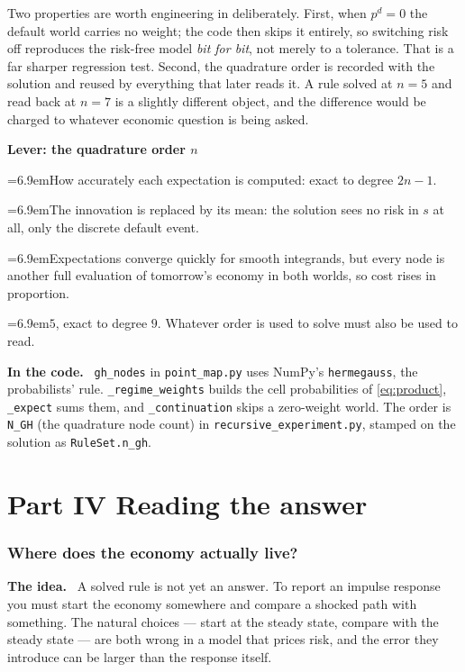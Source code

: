 \documentclass[10pt,a4paper]{article}
\newenvironment{idea}{\begin{shaded}\noindent\textbf{The idea.}\ }{\end{shaded}}
\newcommand{\leverrow}[2]{\par\noindent\hangindent=6.9em\hangafter=1\makebox[6.9em][l]{\textit{#1}}#2}
\newenvironment{lever}[1]{\par\begin{framed}\small\noindent\textcolor{levcol}{\textbf{Lever: #1}}\par\vspace{2pt}}{\end{framed}}
\newenvironment{incode}{\begin{leftbar}\small\noindent\textcolor{codecol}{\textbf{In the code.}}\ }{\end{leftbar}}
\theoremstyle{plain}
\theoremstyle{remark}
\newcommand{\file}[1]{\textcolor{codecol}{\texttt{#1}}}
\newcommand{\code}[1]{\texttt{#1}}
\begin{document}
\noindent Two properties are worth engineering in deliberately. First, when $p^d=0$ the default
world carries no weight; the code then skips it entirely, so switching risk off reproduces the
risk-free model \emph{bit for bit}, not merely to a tolerance. That is a far sharper regression test.
Second, the quadrature order is recorded with the solution and reused by everything that later reads
it. A rule solved at $n=5$ and read back at $n=7$ is a slightly different object, and the difference
would be charged to whatever economic question is being asked.

\begin{lever}{the quadrature order $n$}
\leverrow{Controls}{How accurately each expectation is computed: exact to degree $2n-1$.}
\leverrow{Push to 1}{The innovation is replaced by its mean: the solution sees no risk in $s$ at all,
only the discrete default event.}
\leverrow{Push up}{Expectations converge quickly for smooth integrands, but every node is another full
evaluation of tomorrow's economy in both worlds, so cost rises in proportion.}
\leverrow{Here}{$5$, exact to degree $9$. Whatever order is used to solve must also be used to read.}
\end{lever}

\begin{incode}
\code{gh\_nodes} in \file{point\_map.py} uses NumPy's \code{hermegauss}, the probabilists' rule.
\code{\_regime\_weights} builds the cell probabilities of \eqref{eq:product}, \code{\_expect} sums them,
and \code{\_continuation} skips a zero-weight world. The order is \code{N\_GH} (the quadrature node
count) in \file{recursive\_experiment.py}, stamped on the solution as \code{RuleSet.n\_gh}.
\end{incode}

\part*{Part IV \quad Reading the answer}
\section{Where does the economy actually live?}
\label{sec:reading}

\begin{idea}
A solved rule is not yet an answer. To report an impulse response you must start the economy
somewhere and compare a shocked path with something. The natural choices --- start at the steady
state, compare with the steady state --- are both wrong in a model that prices risk, and the error
they introduce can be larger than the response itself.
\end{idea}
\end{document}
